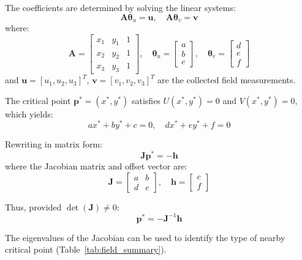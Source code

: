 \documentclass[lettersize,journal]{IEEEtran}
\begin{document}
The coefficients are determined by solving the linear systems:
\begin{equation}
\mathbf{A}\boldsymbol{\theta}_u = \mathbf{u}, \quad \mathbf{A}\boldsymbol{\theta}_v = \mathbf{v}
\label{eq:coeff_solve}
\end{equation}
where:
\begin{equation}
\mathbf{A} = \begin{bmatrix} x_1 & y_1 & 1 \\ x_2 & y_2 & 1 \\ x_3 & y_3 & 1 \end{bmatrix}, \quad \boldsymbol{\theta}_u = \begin{bmatrix} a \\ b \\ c \end{bmatrix}, \quad \boldsymbol{\theta}_v = \begin{bmatrix} d \\ e \\ f \end{bmatrix}
\end{equation}
and $\mathbf{u} = [u_1, u_2, u_3]^T$, $\mathbf{v} = [v_1, v_2, v_3]^T$ are the collected field measurements.

The critical point $\mathbf{p}^* = (x^*, y^*)$ satisfies $U(x^*, y^*) = 0$ and $V(x^*, y^*) = 0$, which yields:
\begin{equation}
ax^* + by^* + c = 0, \quad dx^* + ey^* + f = 0
\end{equation}

Rewriting in matrix form:
\begin{equation}
\mathbf{J}\mathbf{p}^* = -\mathbf{h}
\end{equation}
where the Jacobian matrix and offset vector are:
\begin{equation}
\mathbf{J} = \begin{bmatrix} a & b \\ d & e \end{bmatrix}, \quad \mathbf{h} = \begin{bmatrix} c \\ f \end{bmatrix}
\label{eq:jacobian_offset}
\end{equation}

Thus, provided $\det(\mathbf{J}) \neq 0$:
\begin{equation}
\mathbf{p}^* = -\mathbf{J}^{-1}\mathbf{h}
\end{equation}

The eigenvalues of the Jacobian can be used to identify the type of nearby critical point (Table~\ref{tab:field_summary}).
\end{document}
